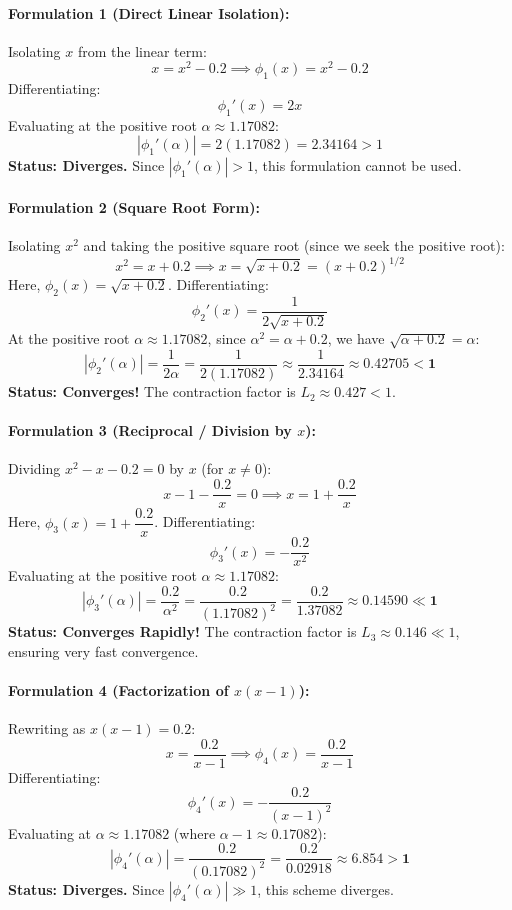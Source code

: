 \documentclass[11pt,a4paper]{article}
\newcommand{\abs}[1]{\left\lvert#1\right\rvert}
\begin{document}
\paragraph{Formulation 1 (Direct Linear Isolation):}
Isolating $x$ from the linear term:
\[
x = x^2 - 0.2 \implies \phi_1(x) = x^2 - 0.2
\]
Differentiating:
\[
\phi_1'(x) = 2x
\]
Evaluating at the positive root $\alpha \approx 1.17082$:
\[
\abs{\phi_1'(\alpha)} = 2(1.17082) = 2.34164 > 1
\]
\textbf{Status: Diverges.} Since $\abs{\phi_1'(\alpha)} > 1$, this formulation cannot be used.

\paragraph{Formulation 2 (Square Root Form):}
Isolating $x^2$ and taking the positive square root (since we seek the positive root):
\[
x^2 = x + 0.2 \implies x = \sqrt{x + 0.2} = (x + 0.2)^{1/2}
\]
Here, $\phi_2(x) = \sqrt{x + 0.2}$. Differentiating:
\[
\phi_2'(x) = \frac{1}{2\sqrt{x + 0.2}}
\]
At the positive root $\alpha \approx 1.17082$, since $\alpha^2 = \alpha + 0.2$, we have $\sqrt{\alpha + 0.2} = \alpha$:
\[
\abs{\phi_2'(\alpha)} = \frac{1}{2\alpha} = \frac{1}{2(1.17082)} \approx \frac{1}{2.34164} \approx \mathbf{0.42705 < 1}
\]
\textbf{Status: Converges!} The contraction factor is $L_2 \approx 0.427 < 1$.

\paragraph{Formulation 3 (Reciprocal / Division by $x$):}
Dividing $x^2 - x - 0.2 = 0$ by $x$ (for $x \neq 0$):
\[
x - 1 - \frac{0.2}{x} = 0 \implies x = 1 + \frac{0.2}{x}
\]
Here, $\phi_3(x) = 1 + \dfrac{0.2}{x}$. Differentiating:
\[
\phi_3'(x) = -\frac{0.2}{x^2}
\]
Evaluating at the positive root $\alpha \approx 1.17082$:
\[
\abs{\phi_3'(\alpha)} = \frac{0.2}{\alpha^2} = \frac{0.2}{(1.17082)^2} = \frac{0.2}{1.37082} \approx \mathbf{0.14590 \ll 1}
\]
\textbf{Status: Converges Rapidly!} The contraction factor is $L_3 \approx 0.146 \ll 1$, ensuring very fast convergence.

\paragraph{Formulation 4 (Factorization of $x(x - 1)$):}
Rewriting as $x(x - 1) = 0.2$:
\[
x = \frac{0.2}{x - 1} \implies \phi_4(x) = \frac{0.2}{x - 1}
\]
Differentiating:
\[
\phi_4'(x) = -\frac{0.2}{(x - 1)^2}
\]
Evaluating at $\alpha \approx 1.17082$ (where $\alpha - 1 \approx 0.17082$):
\[
\abs{\phi_4'(\alpha)} = \frac{0.2}{(0.17082)^2} = \frac{0.2}{0.02918} \approx \mathbf{6.854 > 1}
\]
\textbf{Status: Diverges.} Since $\abs{\phi_4'(\alpha)} \gg 1$, this scheme diverges.
\end{document}
